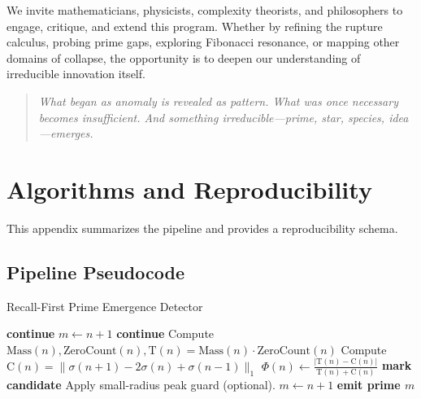 \documentclass[11pt]{article}
\theoremstyle{plain}
\theoremstyle{definition}
\newcommand{\mass}{\mathrm{Mass}}                            %
\newcommand{\zcount}{\mathrm{ZeroCount}}                    %
\newcommand{\tension}{\mathrm{T}}                           %
\newcommand{\curv}{\mathrm{C}}                              %
\newcommand{\phidet}{\Phi}                                  %
\begin{document}
We invite mathematicians, physicists, complexity theorists, and philosophers to engage, critique, and extend this program. Whether by refining the rupture calculus, probing prime gaps, exploring Fibonacci resonance, or mapping other domains of collapse, the opportunity is to deepen our understanding of irreducible innovation itself.

\begin{quote}
\emph{What began as anomaly is revealed as pattern.  
What was once necessary becomes insufficient.  
And something irreducible—prime, star, species, idea—emerges.}
\end{quote}

\appendix

\section{Algorithms and Reproducibility}\label{app:alg}

This appendix summarizes the pipeline and provides a reproducibility schema.

\subsection*{Pipeline Pseudocode}
\begin{algorithm}[h!]
\caption{Recall-First Prime Emergence Detector}
\begin{algorithmic}[1]
   \textbf{continue}  \EndIf
  \State $m \gets n+1$
   \textbf{continue}  \EndIf
  \State Compute $\mass(n), \zcount(n), \tension(n) = \mass(n)\cdot\zcount(n)$
  \State Compute $\curv(n) = \|\sigma(n+1) - 2\sigma(n) + \sigma(n-1)\|_1$
  \State $\phidet(n) \gets \frac{|\tension(n)-\curv(n)|}{\tension(n)+\curv(n)}$
  \If{$\phidet(n) > \tau$} \textbf{mark candidate} \EndIf
\EndFor
\State Apply small-radius peak guard (optional).
  \State $m \gets n+1$
   \textbf{emit prime $m$}  \EndIf
\EndFor
\end{algorithmic}
\end{algorithm}
\end{document}
